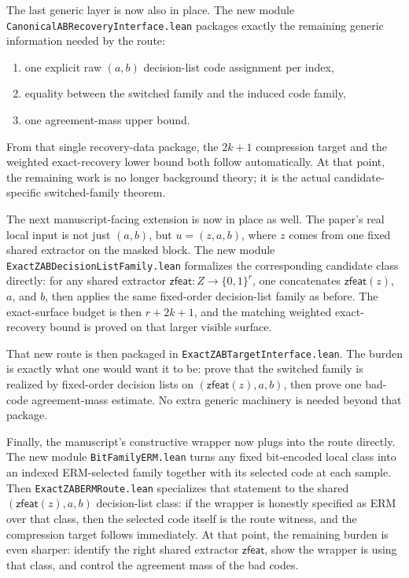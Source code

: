 \documentclass[11pt]{article}
\theoremstyle{remark}
\begin{document}
The last generic layer is now also in place.  The new module
\texttt{CanonicalABRecoveryInterface.lean} packages exactly the remaining
generic information needed by the route:
\begin{enumerate}[leftmargin=1.5em]
  \item one explicit raw \((a,b)\) decision-list code assignment per index,
  \item equality between the switched family and the induced code family,
  \item one agreement-mass upper bound.
\end{enumerate}
From that single recovery-data package, the \(2k+1\) compression target and the
weighted exact-recovery lower bound both follow automatically.  At that point,
the remaining work is no longer background theory; it is the actual
candidate-specific switched-family theorem.

The next manuscript-facing extension is now in place as well.  The paper's real
local input is not just \((a,b)\), but \(u=(z,a,b)\), where \(z\) comes from one
fixed shared extractor on the masked block.  The new module
\texttt{ExactZABDecisionListFamily.lean} formalizes the corresponding candidate
class directly: for any shared extractor \(\mathsf{zfeat}: Z \to \{0,1\}^r\), one
concatenates \(\mathsf{zfeat}(z)\), \(a\), and \(b\), then applies the same
fixed-order decision-list family as before.  The exact-surface budget is then
\(r+2k+1\), and the matching weighted exact-recovery bound is proved on that
larger visible surface.

That new route is then packaged in \texttt{ExactZABTargetInterface.lean}.  The
burden is exactly what one would want it to be: prove that the switched family
is realized by fixed-order decision lists on \((\mathsf{zfeat}(z),a,b)\), then
prove one bad-code agreement-mass estimate.  No extra generic machinery is
needed beyond that package.

Finally, the manuscript's constructive wrapper now plugs into the route
directly.  The new module \texttt{BitFamilyERM.lean} turns any fixed bit-encoded
local class into an indexed ERM-selected family together with its selected code
at each sample.  Then \texttt{ExactZABERMRoute.lean} specializes that statement
to the shared \((\mathsf{zfeat}(z),a,b)\) decision-list class: if the wrapper is
honestly specified as ERM over that class, then the selected code itself is the
route witness, and the compression target follows immediately.  At that point,
the remaining burden is even sharper: identify the right shared extractor
\(\mathsf{zfeat}\), show the wrapper is using that class, and control the
agreement mass of the bad codes.
\end{document}
